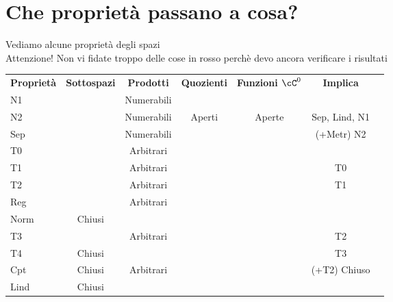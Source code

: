 \documentclass[a4paper,NoNotes,GeneralMath]{stdmdoc}
\newcommand{\Arbitrari}{Arbitrari}
\newcommand{\Numerabili}{Numerabili}
\newcommand{\rd}[1]{{\color{red} #1 }}
\begin{document}
	\section*{Che proprietà passano a cosa?}
	Vediamo alcune proprietà degli spazi \\
	Attenzione! Non vi fidate troppo delle cose in rosso perchè devo ancora verificare i risultati \\
	\begin{tabular}{lcccccc}
	{\bf Proprietà} & {\bf Sottospazi} & {\bf Prodotti} & {\bf Quozienti} & {\bf Funzioni $\cC^0$} & {\bf Implica}     \\
	N1              & \rd\checkmark    & \rd\Numerabili &                 &                        &                   \\ \hline
	N2              & \rd\checkmark    & \rd\Numerabili & \rd{Aperti}     & \rd{Aperte}            & Sep, Lind, N1     \\ \hline
	Sep             & \crossmark       & \Numerabili    &                 & \checkmark             & (+Metr) N2        \\ \hline
	T0              & \checkmark       & \Arbitrari     &                 &                        &                   \\ \hline

	T1              & \checkmark       & \Arbitrari     &                 &                        & T0                \\ \hline
	T2              & \checkmark       & \Arbitrari     &                 &                        & T1                \\ \hline
	Reg             & \rd\checkmark    & \rd\Arbitrari  &                 &                        &                   \\ \hline
	Norm            & \rd{Chiusi}      & \rd\crossmark  &                 &                        &                   \\ \hline

	T3              & \rd\checkmark    & \rd\Arbitrari  &                 &                        & T2                \\ \hline
	T4              & \rd{Chiusi}      & \rd\crossmark  &                 &                        & T3                \\ \hline
	Cpt             & Chiusi           & \rd\Arbitrari  &                 & \checkmark             & (+T2) Chiuso      \\ \hline
	Lind            & Chiusi           & \rd\crossmark  &                 &                        &                   \\ \hline


\end{tabular}
\end{document}
